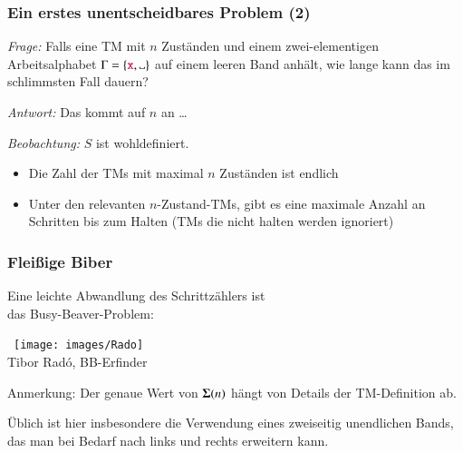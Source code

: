 \documentclass[onlymath]{beamer}
\begin{document}
\begin{frame}[t]\frametitle{Ein erstes unentscheidbares Problem (2)}

\emph{Frage:} Falls eine TM \alert{mit $n$ Zuständen} und \alert{einem zwei-elementigen Arbeitsalphabet $\Gamma=\{\Sterm{x}, \blank\}$} auf einem \alert{leeren Band} anhält, wie lange kann das im schlimmsten Fall dauern?\\
\bigskip\pause

\emph{Antwort:} Das kommt auf $n$ an \ldots\bigskip\pause


\emph{Beobachtung:} $S$ ist wohldefiniert.
\begin{itemize}
\item Die Zahl der TMs mit maximal $n$ Zuständen ist endlich
\item Unter den relevanten $n$-Zustand-TMs, gibt es eine maximale Anzahl an Schritten bis zum Halten (TMs die nicht halten werden ignoriert)
\end{itemize}

\end{frame}

\begin{frame}\frametitle{Fleißige Biber}\label{frame_rado}

\begin{minipage}[b]{7.5cm}
Eine leichte Abwandlung des Schrittzählers ist\\das Busy-Beaver-Problem:
\end{minipage}%
\begin{minipage}[t]{2.5cm}
~\hspace{2mm}\texttt{[image: images/Rado]}\\
{\tiny \mbox{}\hspace{2mm}Tibor Rad\'{o}, BB-Erfinder}
\end{minipage}\bigskip



Anmerkung: Der genaue Wert von $\boldsymbol{\Sigma}(n)$ hängt von Details der TM-Definition ab.\\[0.5ex]
{\footnotesize Üblich ist hier insbesondere die Verwendung eines zweiseitig unendlichen Bands, das man bei Bedarf nach links und rechts erweitern kann.

}

\end{frame}
\end{document}
